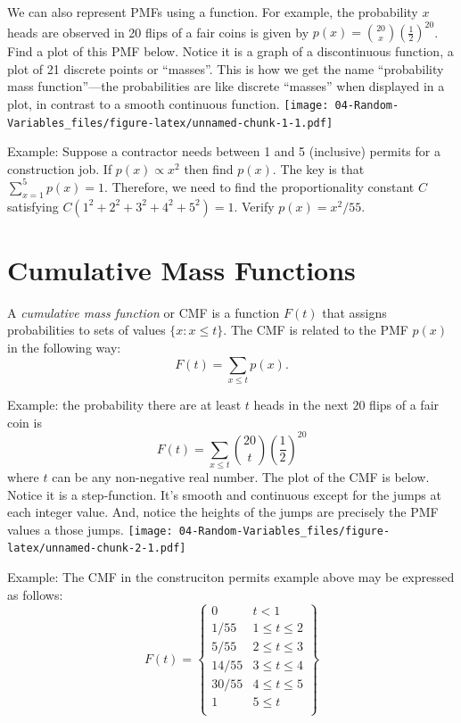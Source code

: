 \documentclass[
]{book}
\begin{document}
We can also represent PMFs using a function. For example, the probability \(x\) heads are observed in 20 flips of a fair coins is given by \(p(x) = {20 \choose x}(\frac{1}{2})^{20}\). Find a plot of this PMF below. Notice it is a graph of a discontinuous function, a plot of 21 discrete points or ``masses''. This is how we get the name ``probability mass function''---the probabilities are like discrete ``masses'' when displayed in a plot, in contrast to a smooth continuous function.
\texttt{[image: 04-Random-Variables\_files/figure-latex/unnamed-chunk-1-1.pdf]}

Example: Suppose a contractor needs between 1 and 5 (inclusive) permits for a construction job. If \(p(x)\propto x^2\) then find \(p(x)\). The key is that \(\sum_{x=1}^5 p(x) = 1\). Therefore, we need to find the proportionality constant \(C\) satisfying \(C(1^2+2^2+3^2+4^2+5^2) = 1\). Verify \(p(x) = x^2 / 55\).

\hypertarget{cumulative-mass-functions}{%
\section{Cumulative Mass Functions}\label{cumulative-mass-functions}}

A \emph{cumulative mass function} or CMF is a function \(F(t)\) that assigns probabilities to sets of values \(\{x: x\leq t\}\). The CMF is related to the PMF \(p(x)\) in the following way:
\[F(t) = \sum_{x\leq t} p(x).\]

Example: the probability there are at least \(t\) heads in the next \(20\) flips of a fair coin is
\[F(t) = \sum_{x\leq t} {20 \choose t}\left(\frac{1}{2}\right)^{20}\]
where \(t\) can be any non-negative real number. The plot of the CMF is below. Notice it is a step-function. It's smooth and continuous except for the jumps at each integer value. And, notice the heights of the jumps are precisely the PMF values a those jumps.
\texttt{[image: 04-Random-Variables\_files/figure-latex/unnamed-chunk-2-1.pdf]}

Example: The CMF in the construciton permits example above may be expressed as follows:
\[F(t) =\left\{ \begin{matrix} 
0  & t < 1 \\ 
1/55 & 1\leq t\leq 2 \\ 
5/55 & 2\leq t\leq 3 \\
14/55 & 3\leq t\leq 4 \\
30/55 & 4\leq t\leq 5 \\
1 & 5\leq t \\
\end{matrix}\right\}   \]
\end{document}
